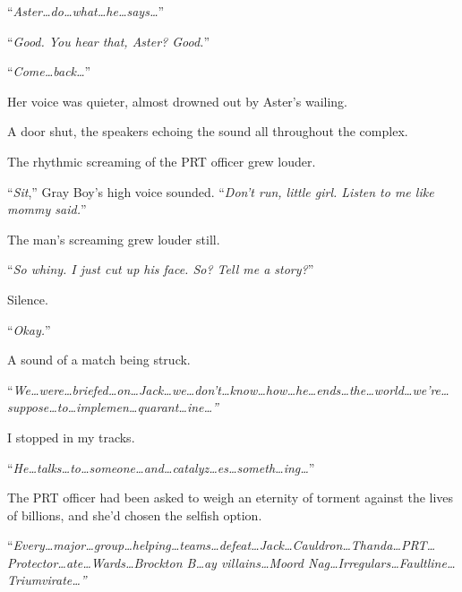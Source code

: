 ``\emph{Aster\ldots do\ldots what\ldots he\ldots says\ldots}''



``\emph{Good.  You hear that, Aster?  Good.}''



``\emph{Come\ldots back\ldots}''



Her voice was quieter, almost drowned out by Aster's wailing.



A door shut, the speakers echoing the sound all throughout the complex.



The rhythmic screaming of the PRT officer grew louder.



``\emph{Sit},'' Gray Boy's high voice sounded.  ``\emph{Don't run, little girl.  Listen to me like mommy said.}''



The man's screaming grew louder still.



``\emph{So whiny.  I just cut up his face.  So?  Tell me a story?}''



Silence.



``\emph{Okay.}''



A sound of a match being struck.



``\emph{We\ldots were\ldots briefed\ldots on\ldots Jack\ldots  we\ldots don't\ldots know\ldots how\ldots he\ldots ends\ldots the\ldots world\ldots we're\ldots suppose\ldots to\ldots implemen\ldots quarant\ldots ine\ldots''}



I stopped in my tracks.



``\emph{He\ldots talks\ldots to\ldots someone\ldots and\ldots catalyz\ldots es\ldots someth\ldots ing\ldots}''



The PRT officer had been asked to weigh an eternity of torment against the lives of billions, and she'd chosen the selfish option.



``\emph{Every\ldots major\ldots group\ldots helping\ldots teams\ldots defeat\ldots Jack\ldots  Cauldron\ldots Thanda\ldots PRT\ldots Protector\ldots ate\ldots Wards\ldots Brockton B\ldots ay villains\ldots Moord Nag\ldots Irregulars\ldots Faultline\ldots Triumvirate\ldots''}



